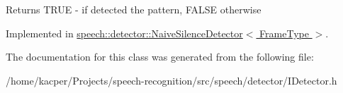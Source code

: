 \begin{DoxyReturn}{Returns}
T\+R\+U\+E -\/ if detected the pattern, F\+A\+L\+S\+E otherwise 
\end{DoxyReturn}


Implemented in \hyperlink{classspeech_1_1detector_1_1NaiveSilenceDetector_a5d2bc90b3012c10496b557a96a71aa68}{speech\+::detector\+::\+Naive\+Silence\+Detector$<$ Frame\+Type $>$}.



The documentation for this class was generated from the following file\+:\begin{DoxyCompactItemize}
\item 
/home/kacper/\+Projects/speech-\/recognition/src/speech/detector/I\+Detector.\+h\end{DoxyCompactItemize}
